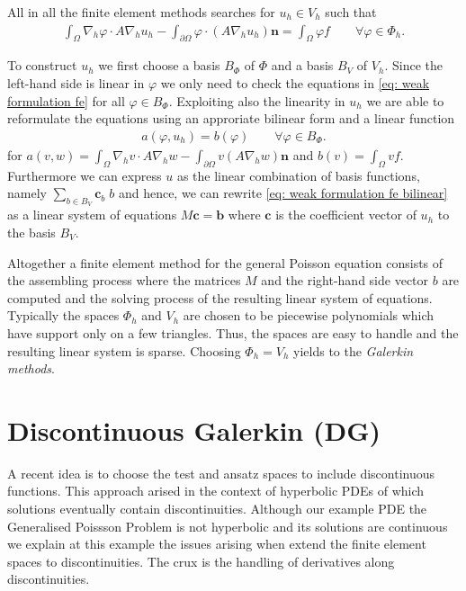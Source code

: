 All in all the finite element methods searches for $u_h \in V_h$ such that 
\begin{align}
	\int_\Omega \nabla_h \varphi  \cdot A\nabla_h u_h -\int_{\partial \Omega} \varphi  \cdot (A\nabla_h u_h) \mathbf{n}  = \int_\Omega \varphi f \qquad \forall \varphi \in \Phi_h. \label{eq: weak formulation fe}
\end{align}

To construct $u_h$ we first choose a basis $B_{\Phi}$ of $\Phi$ and a basis $B_V$ of $V_h$.
Since the left-hand side is linear in $\varphi$ we only need to check the equations in \eqref{eq: weak formulation fe} for all $\varphi \in B_{\Phi}$. Exploiting also the linearity in $u_h$  we are able to reformulate the equations using an approriate bilinear form and a linear function
\begin{align}
	a(\varphi,u_h)  =b(\varphi) \qquad \forall \varphi \in B_{\Phi}. \label{eq: weak formulation fe bilinear}
\end{align}
for $a(v,w)= \int_\Omega \nabla_h v  \cdot A\nabla_h w -\int_{\partial \Omega} v (A\nabla_h w)\mathbf{n}$ and $b(v) = \int_\Omega v f$.\\
Furthermore we can express $u$ as the linear combination of basis functions, namely $\sum_{b \in B_V} \mathbf{c}_b \; b$ and hence, we can rewrite \eqref{eq: weak formulation fe bilinear} as a linear system of equations $M \mathbf{c} = \mathbf{b}$ where  $\mathbf{c}$ is the coefficient vector of $u_h$ to the basis $B_V$.  

Altogether a finite element method for the general Poisson equation consists of the assembling process where the matrices $M$ and the right-hand side vector $b$ are computed and the solving process of the resulting linear system of equations.\\
Typically the spaces $\Phi_h$ and $V_h$ are chosen to be piecewise polynomials which have support only on a few triangles. Thus, the spaces are easy to handle and the resulting linear system is sparse.
Choosing $\Phi_h = V_h$ yields to the \emph{Galerkin methods}.

\section{Discontinuous Galerkin (DG)} \label{sec: SIPG}
A recent idea is to choose the test and ansatz spaces to include discontinuous functions. This approach arised in the context of hyperbolic PDEs of which solutions eventually contain discontinuities. Although our example PDE the Generalised Poissson Problem is not hyperbolic and its solutions are continuous we explain at this example the issues arising when extend the finite element spaces to discontinuities. The crux is the handling of derivatives along discontinuities.

